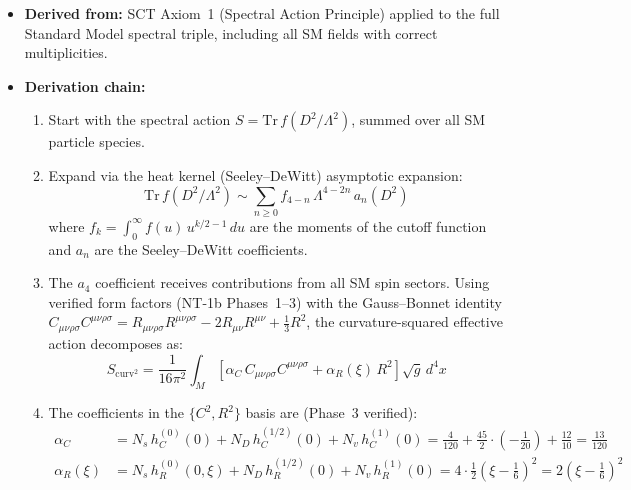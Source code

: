 \documentclass[11pt,a4paper]{article}
\begin{document}
\begin{itemize}[leftmargin=2em]
  \item \textbf{Derived from:} SCT Axiom~1 (Spectral Action Principle) applied to the full Standard Model spectral triple, including all SM fields with correct multiplicities.
  \item \textbf{Derivation chain:}
    \begin{enumerate}
      \item Start with the spectral action $S = \mathrm{Tr}\,f(D^2/\Lambda^2)$, summed over all SM particle species.
      \item Expand via the heat kernel (Seeley--DeWitt) asymptotic expansion:
        \begin{equation}
          \mathrm{Tr}\,f(D^2/\Lambda^2) \sim \sum_{n\geq 0} f_{4-n}\,\Lambda^{4-2n}\,a_n(D^2)
          \label{eq:heat-kernel-expansion}
        \end{equation}
        where $f_k = \int_0^\infty f(u)\,u^{k/2-1}\,du$ are the moments of the cutoff function and $a_n$ are the Seeley--DeWitt coefficients.
      \item The $a_4$ coefficient receives contributions from all SM spin sectors.
        Using verified form factors (NT-1b Phases~1--3) with the Gauss--Bonnet identity
        $C_{\mu\nu\rho\sigma}C^{\mu\nu\rho\sigma} = R_{\mu\nu\rho\sigma}R^{\mu\nu\rho\sigma} - 2R_{\mu\nu}R^{\mu\nu} + \tfrac{1}{3}R^2$,
        the curvature-squared effective action decomposes as:
        \begin{equation}
          S_{\text{curv}^2} = \frac{1}{16\pi^2}\int_M\!\left[
            \alpha_C\,C_{\mu\nu\rho\sigma}C^{\mu\nu\rho\sigma}
            + \alpha_R(\xi)\,R^2
          \right]\sqrt{g}\,d^4x
          \label{eq:curv-squared-action}
        \end{equation}
      \item The coefficients in the $\{C^2, R^2\}$ basis are (Phase~3 verified):
        \begin{align}
          \alpha_C &= N_s\,h_C^{(0)}(0) + N_D\,h_C^{(1/2)}(0) + N_v\,h_C^{(1)}(0)
          = \frac{4}{120} + \frac{45}{2}\!\cdot\!\left(-\frac{1}{20}\right) + \frac{12}{10}
          = \frac{13}{120} \label{eq:alphaC}\\[4pt]
          \alpha_R(\xi) &= N_s\,h_R^{(0)}(0,\xi) + N_D\,h_R^{(1/2)}(0) + N_v\,h_R^{(1)}(0)
          = 4\!\cdot\!\frac{1}{2}\!\left(\xi - \frac{1}{6}\right)^{\!2}
          = 2\!\left(\xi - \frac{1}{6}\right)^{\!2} \label{eq:alphaR}
        \end{align}

\end{enumerate}
\end{itemize}
\end{document}
